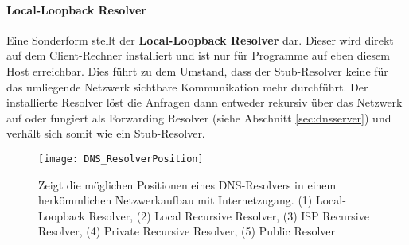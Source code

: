 \paragraph{Local-Loopback Resolver}
Eine Sonderform stellt der \textbf{Local-Loopback Resolver} dar. Dieser wird direkt auf dem Client-Rechner installiert und ist nur für Programme auf eben diesem Host erreichbar. Dies führt zu dem Umstand, dass der Stub-Resolver keine für das umliegende Netzwerk sichtbare Kommunikation mehr durchführt. Der installierte Resolver löst die Anfragen dann entweder rekursiv über das Netzwerk auf oder fungiert als Forwarding Resolver (siehe Abschnitt \ref{sec:dnsserver}) und verhält sich somit wie ein Stub-Resolver.

\begin{figure}[htbp]
    \centering
    \texttt{[image: DNS\_ResolverPosition]}
    \caption[Darstellung möglicher DNS-Resolver positionen im Netzwerk]{Zeigt die möglichen Positionen eines DNS-Resolvers in einem herkömmlichen Netzwerkaufbau mit Internetzugang. (1) Local-Loopback Resolver, (2) Local Recursive Resolver, (3) ISP Recursive Resolver, (4) Private Recursive Resolver, (5) Public Resolver}
    \label{img:dnsresolverposition}
\end{figure}
